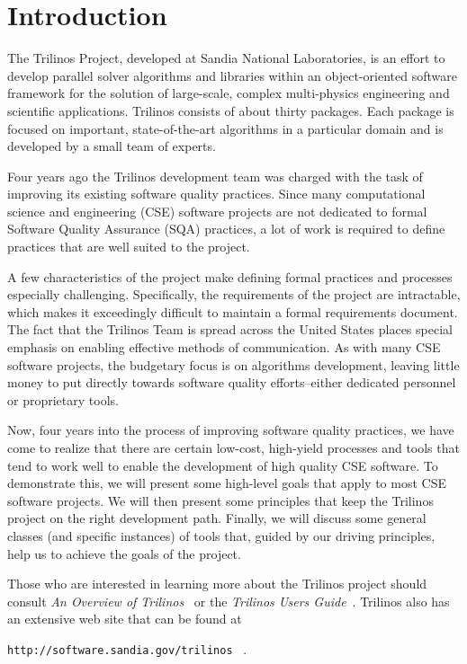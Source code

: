 \documentclass[12pt,relax]{article}
\newcommand{\InlineDirectory}[1]{
  {\hspace{0.01 in}} {\tt #1} {\hspace{0.01 in}}}
\begin{document}

\section{Introduction}
\label{Section:Introduction}


The Trilinos Project, developed at Sandia National Laboratories, is an effort
to develop parallel solver algorithms and libraries within an object-oriented
software framework for the solution of large-scale, complex multi-physics
engineering and scientific applications.  Trilinos consists of about thirty
packages.  Each package is focused on important, state-of-the-art algorithms
in a particular domain and is developed by a small team of experts.

Four years ago the Trilinos development team was charged with the task of
improving its existing software quality practices.  Since many computational
science and engineering (CSE) software projects are not dedicated to formal
Software Quality Assurance (SQA) practices, a lot of work is required to define
practices that are well suited to the project.

A few characteristics of the project make defining formal practices and
processes especially challenging.  Specifically, the requirements of the
project are intractable, which makes it exceedingly difficult to maintain a
formal requirements document.  The fact that the Trilinos Team is spread
across the United States places special emphasis on enabling effective methods
of communication.  As with many CSE software projects, the budgetary focus is
on algorithms development, leaving little money to put directly towards
software quality efforts--either dedicated personnel or proprietary tools.

Now, four years into the process of improving software quality practices, we 
have come to realize that there are certain low-cost, high-yield processes and
tools that tend to work well to enable the development of high quality CSE
software.  To demonstrate this, we will present some high-level goals that 
apply to most CSE software projects.  We will then present some principles that
keep the Trilinos project on the right development path.  Finally, we will
discuss some general classes (and specific instances) of tools that, guided
by our driving principles, help us to achieve the goals of the project.

Those who are interested in learning more about the Trilinos project should
consult {\it An Overview of Trilinos}~\cite{Trilinos-Overview} or the
{\it Trilinos Users Guide}~\cite{Trilinos-Users-Guide}.  Trilinos also has an
extensive web site that can be found at \newline
\InlineDirectory{http://software.sandia.gov/trilinos}~\cite{Trilinos-home-page}.
\end{document}
